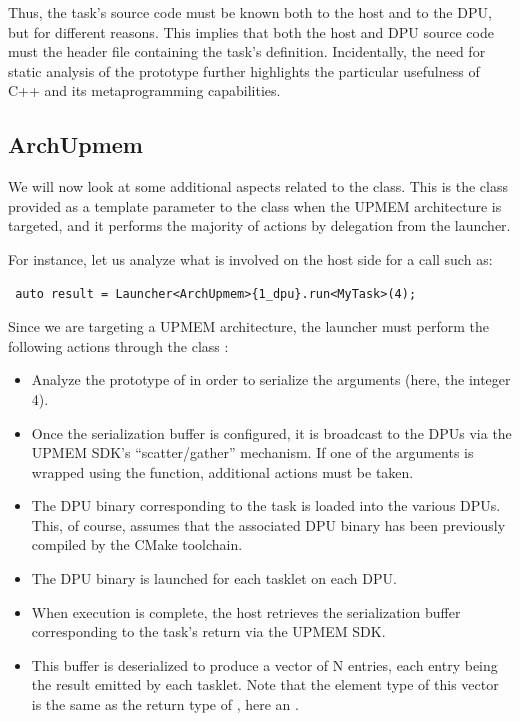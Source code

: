 Thus, the task’s source code must be known both to the host and to the DPU, but for different reasons. 
This implies that both the host and DPU source code must  the header file containing the task’s definition.
Incidentally, the need for static analysis of the  prototype further highlights the particular usefulness
 of C++ and its metaprogramming capabilities.

 \subsection{ArchUpmem}
We will now look at some additional aspects related to the  class. 
This is the class provided as a template parameter to the  class when the UPMEM architecture is targeted, 
and it performs the majority of actions by delegation from the launcher.

For instance, let us analyze what is involved on the host side for a call such as:
 \begin{verbatim}
 auto result = Launcher<ArchUpmem>{1_dpu}.run<MyTask>(4);
 \end{verbatim}

 Since we are targeting a UPMEM architecture, the launcher must perform the following actions through the class :
 \begin{itemize}
 \item Analyze the prototype of  in order to serialize the arguments (here, the integer 4).
 \item Once the serialization buffer is configured, it is broadcast to the DPUs via the UPMEM SDK’s “scatter/gather” mechanism.
  If one of the arguments is wrapped using the  function, additional actions must be taken.
 \item The DPU binary corresponding to the task is loaded into the various DPUs.
 This, of course, assumes that the associated DPU binary has been previously compiled by the CMake toolchain.
 \item The DPU binary is launched for each tasklet on each DPU.
 \item When execution is complete, the host retrieves the serialization buffer corresponding to the task’s return via the
  UPMEM SDK.
 \item This buffer is deserialized to produce a vector of N entries, each entry being the result emitted by each tasklet.
  Note that the element type of this  vector is the same as the return type of , 
  here an .
 \end{itemize}
 
